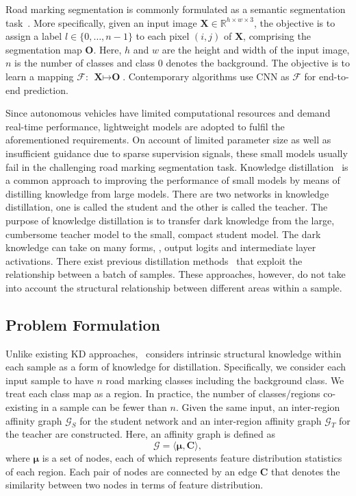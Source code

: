 \documentclass[10pt,twocolumn,letterpaper]{article}
\begin{document}
Road marking segmentation is commonly formulated as a semantic segmentation task~\cite{wang2019apolloscape}. More specifically, given an input image $\textbf{X} \in \mathbb{R}^{h \times w \times 3}$, the objective is to assign a label $l \in \{0, \dots, n-1\}$ to each pixel $(i, j)$ of $\textbf{X}$, comprising the segmentation map $\textbf{O}$. Here, $h$ and $w$ are the height and width of the input image, $n$ is the number of classes and class 0 denotes the background. The objective is to learn a mapping $\mathcal{F}$: $\textbf{X} \mapsto \textbf{O}$. Contemporary algorithms use CNN as $\mathcal{F}$ for end-to-end prediction. 

Since autonomous vehicles have limited computational resources and demand real-time performance, lightweight models are adopted to fulfil the aforementioned requirements. On account of limited parameter size as well as insufficient guidance due to sparse supervision signals, these small models usually fail in the challenging road marking segmentation task. Knowledge distillation~\cite{hinton2015distilling, hou2019learning, liu2019structured} is a common approach to improving the performance of small models by means of distilling knowledge from large models.  There are two networks in knowledge distillation, one is called the student and the other is called the teacher. The purpose of knowledge distillation is to transfer dark knowledge from the large, cumbersome teacher model to the small, compact student model. The dark knowledge can take on many forms, \eg, output logits and intermediate layer activations. 
There exist previous distillation methods~\cite{park2019relational, peng2019correlation, tung2019similarity} that exploit the relationship between a batch of samples. These approaches, however, do not take into account the structural relationship between different areas within a sample.


\subsection{Problem Formulation}
 
Unlike existing KD approaches, \algorithmname~considers intrinsic structural knowledge within each sample as a form of knowledge for distillation.
Specifically, we consider each input sample to have $n$ road marking classes including the background class. We treat each class map as a region. In practice, the number of classes/regions co-existing in a sample can be fewer than $n$.
Given the same input, an inter-region affinity graph $\mathcal{G}_S$ for the student network and an inter-region affinity graph $\mathcal{G}_T$ for the teacher are constructed. Here, an affinity graph is defined as 
\begin{equation}
\label{eqn:graph}
\mathcal{G} = \langle \boldsymbol{\mu}, \mathbf{C} \rangle,
\end{equation}
where $\boldsymbol{\mu}$ is a set of nodes, each of which represents feature distribution statistics of each region. Each pair of nodes are connected by an edge $\mathbf{C}$ that denotes the similarity between two nodes in terms of feature distribution.
\end{document}
